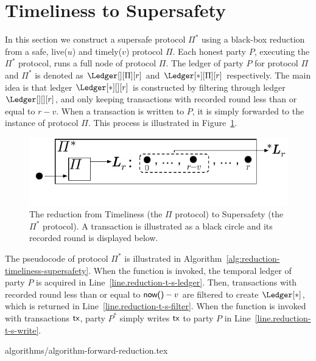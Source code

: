 \section{Timeliness to Supersafety}

In this section we construct a supersafe protocol
$\Pi^*$ using a black-box reduction from a safe, live($u$) and timely($v$)
protocol $\Pi$.
Each honest party $P$, executing the $\Pi^*$ protocol, runs a
full node of protocol $\Pi$.
The ledger of party $P$ for protocol $\Pi$ and $\Pi^*$ is denoted as $\Ledger[][\Pi][r]$ and
$\Ledger[*][\Pi][r]$ respectively.
The main idea is that ledger $\Ledger[*][][r]$ is constructed
by filtering through ledger $\Ledger[][][r]$, and only keeping transactions
with recorded round less than or equal to $r - v$. When a transaction
is written to $P$, it is simply forwarded to the instance of protocol $\Pi$. This process is illustrated
in Figure~\ref{fig:reduction-timeliness-supersafety}.

\begin{figure}
  \centering
  \includegraphics[width=0.7\columnwidth,keepaspectratio]{figures/forward-reduction.pdf}
  \caption{The reduction from Timeliness
    (the $\Pi$ protocol) to Supersafety (the $\Pi^*$ protocol). A transaction is illustrated
    as a black circle and its recorded round is displayed below.
  }
 \label{fig:reduction-timeliness-supersafety}
\end{figure}


The pseudocode of protocol $\Pi^*$ is illustrated in Algorithm~\ref{alg:reduction-timeliness-supersafety}.
When the \rread function is invoked, the temporal ledger of party $P$ is acquired
in Line~\ref{line.reduction-t-s-ledger}.
Then, transactions with recorded round less than or equal to $\textsf{now()} - v$ are
filtered to create $\Ledger[*]$, which is returned in Line~\ref{line.reduction-t-s-filter}.
When the \wwrite function is invoked with transactions $\textsf{tx}$, party $P^*$ simply writes $\textsf{tx}$
to party $P$ in Line~\ref{line.reduction-t-s-write}.

{algorithms/algorithm-forward-reduction.tex}

